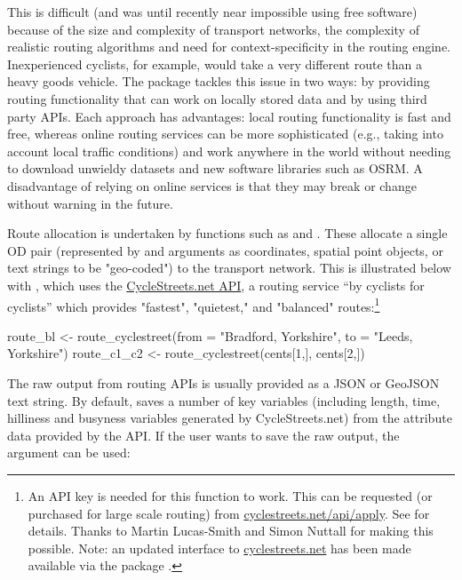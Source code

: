 This is difficult (and was until recently near impossible using free
software) because of the size and complexity of transport networks, the
complexity of realistic routing algorithms and need for
context-specificity in the routing engine. Inexperienced cyclists, for
example, would take a very different route than a heavy goods vehicle.
The  package tackles this issue in two ways: by providing routing
functionality that can work on locally stored data and by using third party APIs.
Each approach has advantages: local routing functionality is fast and free,
whereas online routing services can be more sophisticated (e.g., taking
into account local traffic conditions) and work anywhere in the world
without needing to download unwieldy datasets and new software libraries such
as OSRM.
A disadvantage of relying on online services is that they may break or change
without warning in the future.

Route allocation is undertaken by  functions such as
 and \linebreak {}.
These allocate a single OD pair (represented by  and 
arguments as coordinates,
spatial point objects, or text strings to be
"geo-coded") to the transport network.
This is illustrated
below with , which uses the
\href{http://www.cyclestreets.net/api/}{CycleStreets.net API}, a routing
service ``by cyclists for cyclists'' which provides
"fastest", "quietest," and "balanced" routes:\footnote{An
API key
  is needed for this function to work. This can be requested (or
  purchased for large scale routing) from
  \href{https://www.cyclestreets.net/api/apply/}{cyclestreets.net/api/apply}.
  See  for details. Thanks to Martin
  Lucas-Smith and Simon Nuttall for making this possible.
  Note: an updated interface to \url{cyclestreets.net} has been made available via the package .}

\begin{Schunk}
\begin{Sinput}
route_bl <- route_cyclestreet(from = "Bradford, Yorkshire", to = "Leeds, Yorkshire")
route_c1_c2 <- route_cyclestreet(cents[1,], cents[2,])
\end{Sinput}
\end{Schunk}

The raw output from routing APIs is usually provided as a JSON or
GeoJSON text string. By default,  saves a
number of key variables (including length, time, hilliness and busyness
variables generated by CycleStreets.net) from the attribute data
provided by the API. If the user wants to save the raw output, the
 argument can be used:


